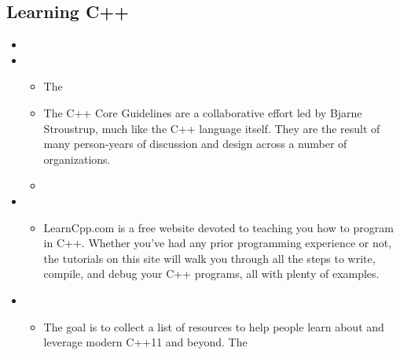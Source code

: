 \documentclass[letterpaper,10pt,english]{sphinxmanual}
\begin{document}
\subsection{Learning C++}
\label{\detokenize{resource/programing/cpp_basic:learning-c}}\begin{itemize}
\item {} 

\item {} 
\begin{itemize}
\item {} 
The 

\item {} 
The C++ Core Guidelines are a collaborative effort led by Bjarne
Stroustrup, much like the C++ language itself. They are the result
of many person-years of discussion and design across a number of
organizations.

\item {} 

\end{itemize}

\item {} 
\begin{itemize}
\item {} 
LearnCpp.com is a free website devoted to teaching you how to
program in C++. Whether you’ve had any prior programming
experience or not, the tutorials on this site will walk you
through all the steps to write, compile, and debug your C++
programs, all with plenty of examples.

\end{itemize}

\item {} 
\begin{itemize}
\item {} 
The goal is to collect a list of resources to help people learn
about and leverage modern C++11 and beyond. The 


\end{itemize}
\end{itemize}
\end{document}
